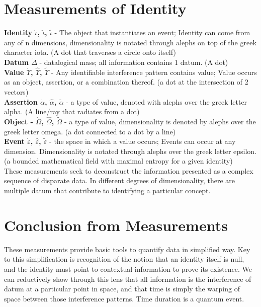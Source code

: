 \documentclass{article}
\begin{document}
\section{Measurements of Identity}
\textbf{Identity $\dot \iota$, $\hat \iota$, $\tilde \iota$} - The object that instantiates an event; Identity can come from any of n dimensions, dimensionality is notated through alephs on top of the greek character iota. (A dot that traverses a circle onto itself)  \\
\textbf{Datum $\dot \Delta$} - datalogical mass; all information contains 1 datum. (A dot) \\
\textbf{Value $\dot \Upsilon$, $\hat \Upsilon$, $\tilde \Upsilon$} - Any identifiable interference pattern contains value; Value occurs as an object, assertion, or a combination thereof. (a dot at the intersection of 2 vectors)  \\
\textbf{Assertion $\dot \alpha$, $\hat \alpha$, $\tilde \alpha$} - a type of value, denoted with alephs over the greek letter alpha. (A line/ray that radiates from a dot)\\
\textbf{Object -  $\dot \Omega$, $\hat \Omega$, $\tilde \Omega$} - a type of value, dimensionality is denoted by alephs over the greek letter omega. (a dot connected to a dot by a line) \\
\textbf{Event  $\dot \varepsilon$, $\hat \varepsilon$, $\tilde \varepsilon$} - the space in which a value occurs; Events can occur at any dimension.  Dimensionality is notated through alephs over the greek letter epsilon. (a bounded mathematical field with maximal entropy for a given identity) \\
These measurements seek to deconstruct the information presented as a complex sequence of disparate data.  In different degrees of dimensionality, there are multiple datum that contribute to identifying a particular concept.

\section{Conclusion from Measurements}
These measurements provide basic tools to quantify data in simplified way.  Key to this simplification is recognition of the notion that an identity itself is null, and the identity must point to contextual information to prove its existence. 
We can reductively show through this lens that all information is the interference of datum at a particular point in space, and that time is simply the warping of space between those interference patterns.  Time duration is a quantum event.
\end{document}

